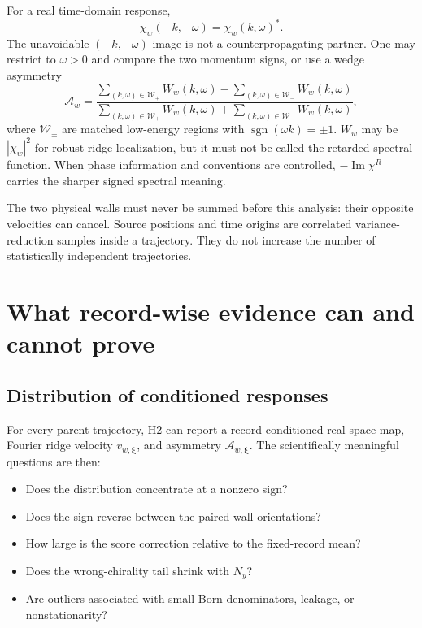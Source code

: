 \documentclass[aps,prb,onecolumn,nofootinbib,superscriptaddress]{revtex4-2}
\newcommand{\bxi}{\bm{\xi}}
\begin{document}
For a real time-domain response,
\begin{equation}
  \chi_w(-k,-\omega)=\chi_w(k,\omega)^*.
  \label{eq:reality-symmetry}
\end{equation}
The unavoidable $(-k,-\omega)$ image is not a counterpropagating partner.  One
may restrict to $\omega>0$ and compare the two momentum signs, or use a wedge
asymmetry
\begin{equation}
  \mathcal A_w=
  \frac{\sum_{(k,\omega)\in\mathcal W_+}W_w(k,\omega)
       -\sum_{(k,\omega)\in\mathcal W_-}W_w(k,\omega)}
       {\sum_{(k,\omega)\in\mathcal W_+}W_w(k,\omega)
       +\sum_{(k,\omega)\in\mathcal W_-}W_w(k,\omega)},
  \label{eq:wedge-asymmetry}
\end{equation}
where $\mathcal W_\pm$ are matched low-energy regions with
$\operatorname{sgn}(\omega k)=\pm1$.  $W_w$ may be $|\chi_w|^2$ for robust
ridge localization, but it must not be called the retarded spectral function.
When phase information and conventions are controlled,
$-\operatorname{Im}\chi^R$ carries the sharper signed spectral meaning.

The two physical walls must never be summed before this analysis: their
opposite velocities can cancel.  Source positions and time origins are
correlated variance-reduction samples inside a trajectory.  They do not
increase the number of statistically independent trajectories.

\section{What record-wise evidence can and cannot prove}
\label{sec:recordwise}

\subsection{Distribution of conditioned responses}

For every parent trajectory, H2 can report a record-conditioned real-space
map, Fourier ridge velocity $v_{w,\bxi}$, and asymmetry
$\mathcal A_{w,\bxi}$.  The scientifically meaningful questions are then:
\begin{itemize}
  \item Does the distribution concentrate at a nonzero sign?
  \item Does the sign reverse between the paired wall orientations?
  \item How large is the score correction relative to the fixed-record mean?
  \item Does the wrong-chirality tail shrink with $N_y$?
  \item Are outliers associated with small Born denominators, leakage, or
  nonstationarity?
\end{itemize}
\end{document}
